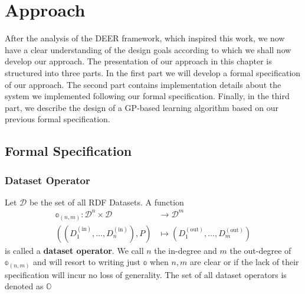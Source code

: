 \chapter{Approach}
\label{ch:approach}
After the analysis of the \ac{DEER} framework, which inspired this work, we now have a clear understanding of the design goals according to which we shall now develop our approach.
The presentation of our approach in this chapter is structured into three parts.
In the first part we will develop a formal specification of our approach.
The second part contains implementation details about the system we implemented following our formal specification.
Finally, in the third part, we describe the design of a \ac{GP}-based learning algorithm based on our previous formal specification.



\section{Formal Specification}
\label{sec:formalspec}

\subsection{Dataset Operator}

Let $\mathcal{D}$ be the set of all \ac{RDF} Datasets.
A function
\begin{equation}
\begin{aligned}
\mathbb{o}_{(n,m)}\colon \mathcal{D}^n \times  \mathcal{D}  &\to \mathcal{D}^m \\
\left(\left(D_{1}^{(\text{in})}, \dots, D_{n}^{(\text{in})}\right), P\right) & \mapsto \left( D_{1}^{(\text{out})}, \dots, D_{m}^{(\text{out})} \right)
\end{aligned}
\end{equation}
is called a \textbf{dataset operator}.
We call $n$ the in-degree and $m$ the out-degree of $\mathbb{o}_{(n,m)}$ and will resort to writing just $\mathbb{o}$ when $n,m$ are clear or if the lack of their specification will incur no loss of generality. The set of all dataset operators is denoted as $\mathbb{O}$\\

